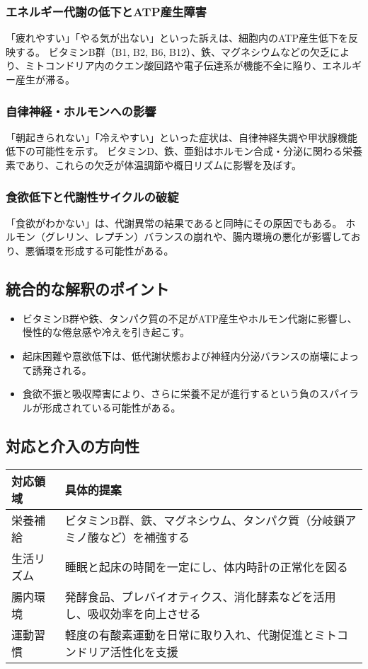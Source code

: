 \documentclass[a4paper,12pt]{article}
\begin{document}
\subsubsection*{エネルギー代謝の低下とATP産生障害}

「疲れやすい」「やる気が出ない」といった訴えは、細胞内のATP産生低下を反映する。  
ビタミンB群（B1, B2, B6, B12）、鉄、マグネシウムなどの欠乏により、ミトコンドリア内のクエン酸回路や電子伝達系が機能不全に陥り、エネルギー産生が滞る。

\subsubsection*{自律神経・ホルモンへの影響}

「朝起きられない」「冷えやすい」といった症状は、自律神経失調や甲状腺機能低下の可能性を示す。  
ビタミンD、鉄、亜鉛はホルモン合成・分泌に関わる栄養素であり、これらの欠乏が体温調節や概日リズムに影響を及ぼす。

\subsubsection*{食欲低下と代謝性サイクルの破綻}

「食欲がわかない」は、代謝異常の結果であると同時にその原因でもある。  
ホルモン（グレリン、レプチン）バランスの崩れや、腸内環境の悪化が影響しており、悪循環を形成する可能性がある。

\subsection*{統合的な解釈のポイント}

\begin{itemize}
  \item ビタミンB群や鉄、タンパク質の不足がATP産生やホルモン代謝に影響し、慢性的な倦怠感や冷えを引き起こす。
  \item 起床困難や意欲低下は、低代謝状態および神経内分泌バランスの崩壊によって誘発される。
  \item 食欲不振と吸収障害により、さらに栄養不足が進行するという負のスパイラルが形成されている可能性がある。
\end{itemize}

\subsection*{対応と介入の方向性}

\begin{table}[H]
\centering
\begin{tabular}{|l|p{10cm}|}
\hline
対応領域 & 具体的提案 \\
\hline
栄養補給 & ビタミンB群、鉄、マグネシウム、タンパク質（分岐鎖アミノ酸など）を補強する \\
生活リズム & 睡眠と起床の時間を一定にし、体内時計の正常化を図る \\
腸内環境 & 発酵食品、プレバイオティクス、消化酵素などを活用し、吸収効率を向上させる \\
運動習慣 & 軽度の有酸素運動を日常に取り入れ、代謝促進とミトコンドリア活性化を支援 \\
\hline
\end{tabular}
\end{table}
\end{document}
